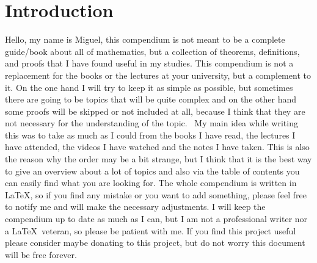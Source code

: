 \newpage
\section{Introduction}

Hello, my name is Miguel, this compendium is not meant to be a complete 
guide/book about all of mathematics,
but a collection of theorems, definitions, and proofs that I have found useful in my studies.
This compendium is not a replacement for the books or the lectures at your university, but a complement to it.
On the one hand I will try to keep it as simple as possible, but sometimes there are going to be topics 
that will be quite 
complex and on the other hand some proofs will be 
skipped or not included at all, because I think that they 
are not necessary for the understanding of the topic.
\newline\
My main idea while writing this was to take as much as I could from the books I have read, the lectures 
I have attended, the videos I have watched 
and the notes I have taken. This is also the reason why the order may be a bit strange, 
but I think that it is the best way to give an overview about a lot of topics and also 
via the table of contents you can
easily find what you are looking for.
\newline
The whole compendium is written in \LaTeX, so if you find any mistake or you want to add something, please 
feel free to notify me and will make the necessary adjustments.
I will keep the compendium up to date as much as 
I can, but I am not a professional writer nor a \LaTeX\ veteran, so please be patient with me.
\newline
If you find this project useful please consider maybe donating
to this project, but do not worry this document will be free forever.

